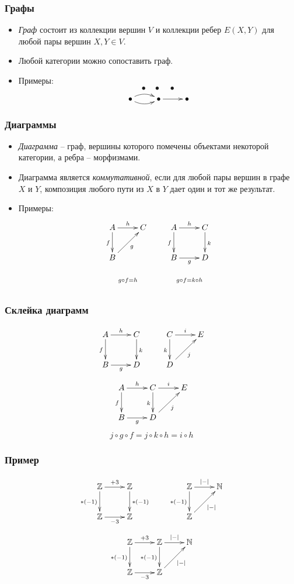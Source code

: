 \documentclass{beamer}
\begin{document}
\begin{frame}
\frametitle{Графы}
\begin{itemize}
\item \emph{Граф} состоит из коллекции вершин $V$ и коллекции ребер $E(X, Y)$ для любой пары вершин $X, Y \in V$.
\item Любой категории можно сопоставить граф.
\item Примеры:
\[ \bullet \quad \bullet \quad \bullet \]
\[ \xymatrix{ \bullet \ar@/^/[r] \ar@/_/[r] & \bullet \ar[r] & \bullet } \]
\end{itemize}
\end{frame}

\begin{frame}
\frametitle{Диаграммы}
\begin{itemize}
\item \emph{Диаграмма} -- граф, вершины которого помечены объектами некоторой категории, а ребра -- морфизмами.
\item Диаграмма является \emph{коммутативной}, если для любой пары вершин в графе $X$ и $Y$, композиция любого пути из $X$ в $Y$ дает один и тот же результат.
\item Примеры:
\[ \xymatrix{ A \ar[r]^h \ar[d]_f & C \\
              B \ar[ur]_g \\
              \ar@{}[r]^{g \circ f = h} &
            }
\qquad
\xymatrix{ A \ar[r]^h \ar[d]_f & C \ar[d]^k \\
           B \ar[r]_g & D \\
           \ar@{}[r]^{g \circ f = k \circ h} &
         } \]
\end{itemize}
\end{frame}

\begin{frame}
\frametitle{Склейка диаграмм}
\[ \xymatrix{ A \ar[r]^h \ar[d]_f & C \ar[d]^k \\
              B \ar[r]_g & D
            }
\qquad
\xymatrix{ C \ar[r]^i \ar[d]_k & E \\
           D \ar[ur]_j
            } \]
\[ \xymatrix{ A \ar[r]^h \ar[d]_f & C \ar[d]_k \ar[r]^i & E \\
              B \ar[r]_g & D \ar[ur]_j
            } \]
\[ j \circ g \circ f = j \circ k \circ h = i \circ h \]
\end{frame}

\begin{frame}
\frametitle{Пример}
\[ \xymatrix{ \mathbb{Z} \ar[r]^{+ 3} \ar[d]_{* (-1)} & \mathbb{Z} \ar[d]^{* (-1)} \\
              \mathbb{Z} \ar[r]_{- 3} & \mathbb{Z}
            }
\qquad
\xymatrix{ \mathbb{Z} \ar[r]^{|-|} \ar[d]_{* (-1)} & \mathbb{N} \\
              \mathbb{Z} \ar[ur]_{|-|}
            } \]
\[ \xymatrix{ \mathbb{Z} \ar[r]^{+ 3} \ar[d]_{* (-1)} & \mathbb{Z} \ar[d]_{* (-1)} \ar[r]^{|-|} & \mathbb{N} \\
              \mathbb{Z} \ar[r]_{- 3} & \mathbb{Z} \ar[ur]_{|-|}
            } \]
\end{frame}
\end{document}
